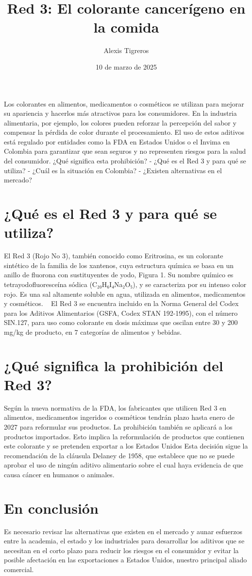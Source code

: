\documentclass{article}
\author{Alexis Tigreros}
\date{10 de marzo de 2025}
\begin{document}
\title{Red 3: El colorante cancerígeno en la comida}
\maketitle
Los colorantes en alimentos, medicamentos o cosméticos se utilizan para mejorar su apariencia y hacerlos más atractivos para los consumidores. En la industria alimentaria, por ejemplo, los colores pueden reforzar la percepción del sabor y compensar la pérdida de color durante el procesamiento. El uso de estos aditivos está regulado por entidades como la FDA en Estados Unidos o el Invima en Colombia para garantizar que sean seguros y no representen riesgos
para la salud del consumidor. ¿Qué significa esta prohibición? - ¿Qué es el Red 3 y para qué se utiliza? - ¿Cuál es la situación en Colombia? - ¿Existen alternativas en el mercado?
\section{¿Qué es el Red 3 y para qué se utiliza?}
El Red 3 (Rojo No 3), también conocido como Eritrosina, es un colorante sintético de la familia de
los xantenos, cuya estructura química se basa en un anillo de fluorona con sustituyentes de yodo, Figura 1. Su nombre químico es tetrayodofluoresceína sódica (C₂₀H₆I₄Na₂O₅), y se caracteriza por su intenso color rojo. Es una sal altamente soluble en agua, utilizada en alimentos, medicamentos y cosméticos.
 
El Red 3 se encuentra incluido en la Norma General del Codex para los Aditivos Alimentarios (GSFA,
Codex STAN 192-1995), con el número SIN.127, para uso como colorante en dosis máximas que oscilan entre 30 y 200 mg/kg de producto, en 7 categorías de alimentos y bebidas.
\section{¿Qué significa la prohibición del Red 3?}
Según la nueva normativa de la FDA, los fabricantes que utilicen Red 3 en alimentos, medicamentos ingeridos o cosméticos tendrán plazo hasta enero de 2027 para reformular sus productos. La prohibición también se aplicará a los productos importados. Esto implica la reformulación de productos que contienen este colorante y se pretenden exportar a los Estados Unidos
Esta decisión sigue la recomendación de la cláusula Delaney de 1958, que establece que no se puede aprobar el uso de ningún aditivo alimentario sobre el cual haya evidencia de que causa cáncer en humanos o animales.
\section{En conclusión}
Es necesario revisar las alternativas que existen en el mercado y aunar esfuerzos entre la academia, el estado y los industriales para desarrollar los aditivos que se necesitan en el corto plazo para reducir los riesgos en el consumidor y evitar la posible afectación en las exportaciones a Estados Unidos, nuestro principal aliado comercial.
\end{document}
